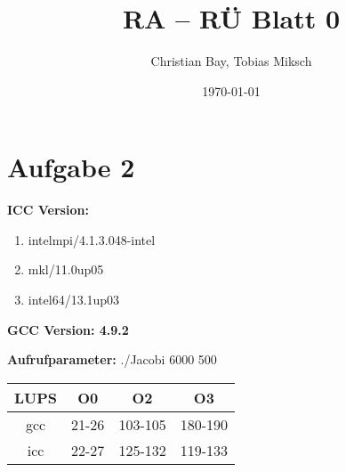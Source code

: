 \documentclass{article}
\title{RA -- R\"U Blatt 0}
\author{Christian Bay, Tobias Miksch}
\date{\today}
\begin{document}
\maketitle
\section*{Aufgabe 2}

\textbf{ICC Version:}
\begin{enumerate}
	\item intelmpi/4.1.3.048-intel
	\item mkl/11.0up05
	\item intel64/13.1up03
\end{enumerate}

\textbf{GCC Version: 4.9.2}
\vspace*{6pt}

\textbf{Aufrufparameter:} ./Jacobi 6000 500
\begin{center}
	\begin{tabular}{| c || c | c | c |}
		LUPS & O0 & O2 & O3 \\
		\hline \hline
		gcc  & 21-26  & 103-105  & 180-190 \\
		\hline
		icc  & 22-27  & 125-132  & 119-133 \\
		\hline
	\end{tabular}
\end{center}
\end{document}
